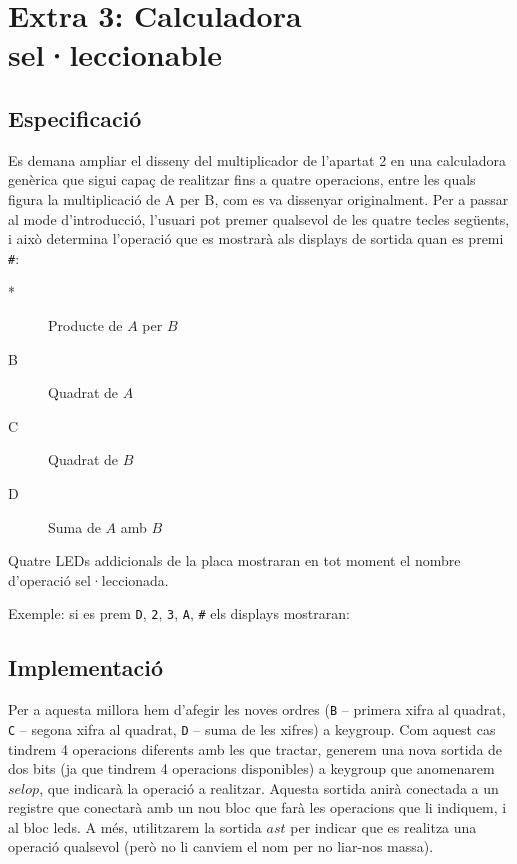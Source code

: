 \chapter{Extra 3: Calculadora sel·leccionable}

\section{Especificació}

Es demana ampliar el disseny del multiplicador de l'apartat 2 en una calculadora genèrica que sigui capaç de realitzar fins a quatre operacions, entre les quals figura la multiplicació de A per B, com es va dissenyar originalment. Per a passar al mode d'introducció, l'usuari pot premer qualsevol de les quatre tecles següents, i això determina l'operació que es mostrarà als displays de sortida quan es premi \texttt{\#}:

\begin{description}
\item[*] Producte de $A$ per $B$
\item[B] Quadrat de $A$
\item[C] Quadrat de $B$
\item[D] Suma de $A$ amb $B$
\end{description}

Quatre LEDs addicionals de la placa mostraran en tot moment el nombre d'operació sel·leccionada.

Exemple: si es prem \texttt{D}, \texttt{2}, \texttt{3}, \texttt{A}, \texttt{\#} els displays mostraran:

\begin{center}
\sevenseg{-}\sevenseg{ } \sevenseg{ }\sevenseg{-}
\end{center}

\section{Implementació}

Per a aquesta millora hem d'afegir les noves ordres (\texttt{B} -- primera xifra al quadrat, \texttt{C} -- segona xifra al quadrat, \texttt{D} --  suma de les xifres) a \textsf{keygroup}. Com aquest cas tindrem 4 operacions diferents amb les que tractar, generem una nova sortida de dos bits (ja que tindrem 4 operacions disponibles) a \textsf{keygroup} que anomenarem $selop$, que indicarà la operació a realitzar. Aquesta sortida anirà conectada a un registre que conectarà amb un nou bloc que farà les operacions que li indiquem, i al bloc \textsf{leds}. A més, utilitzarem la sortida $ast$ per indicar que es realitza una operació qualsevol (però no li canviem el nom per no liar-nos massa).

